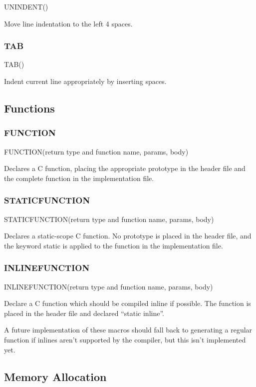 \documentclass[english]{article}
\begin{document}
UNINDENT()

Move line indentation to the left 4 spaces.


\subsubsection{TAB}

TAB()

Indent current line appropriately by inserting spaces.


\subsection{Functions}


\subsubsection{FUNCTION}

FUNCTION(return type and function name, params, body)

Declares a C function, placing the appropriate prototype in the header
file and the complete function in the implementation file.


\subsubsection{STATICFUNCTION}

STATICFUNCTION(return type and function name, params, body)

Declares a static-scope C function. No prototype is placed in the
header file, and the keyword static is applied to the function in
the implementation file.


\subsubsection{INLINEFUNCTION}

INLINEFUNCTION(return type and function name, params, body)

Declare a C function which should be compiled inline if possible.
The function is placed in the header file and declared ``static inline''.

A future implementation of these macros should fall back to
generating a regular function if inlines aren't supported by the
compiler, but this isn't implemented yet.


\subsection{Memory Allocation}
\end{document}
